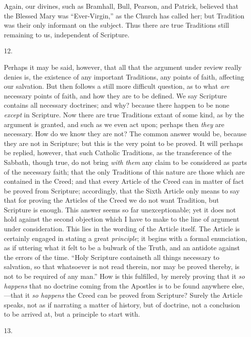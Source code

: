 Again, our divines, such as Bramhall, Bull, Pearson, and Patrick,
believed that the Blessed Mary was ``Ever-Virgin,'' as the
Church has called her; but Tradition was their only informant on the
subject. Thus there are true Traditions still remaining to us,
independent of Scripture.

12.

Perhaps it may be said, however, that all that the argument under
review really denies is, the existence of any important Traditions,
any points of faith, affecting our salvation. But then follows a still
more difficult question, as to what \emph{are} necessary points of
faith, and how they are to be defined. We say Scripture contains all
necessary doctrines; and why? because there happen to be none \emph{except}
in Scripture. Now there are true Traditions extant of some kind, as by
the argument is granted, and such as we even act upon; perhaps then \emph{they} are necessary. How do we know they are not? The common answer
would be, because they are not in Scripture; but this is the very
point to be proved. It will perhaps be replied, however, that such
Catholic Traditions, as the transference of the Sabbath, though
true, do not bring \emph{with them} any claim to be considered as
parts of the necessary faith; that the only Traditions of this nature
are those which are contained in the Creed; and that every Article of
the Creed can in matter of fact be proved from Scripture; accordingly,
that the Sixth Article only means to say that for proving the Articles
of the Creed we do not want Tradition, but Scripture is enough. This
answer seems so far unexceptionable; yet it does not hold against the
second objection which I have to make to the line of argument under
consideration. This lies in the wording of the Article itself. The
Article is certainly engaged in stating a great \emph{principle}; it
begins with a formal enunciation, as if uttering what it felt to be a
bulwark of the Truth, and an antidote against the errors of the time.
``Holy Scripture containeth all things necessary to salvation, so
that whatsoever is not read therein, nor may be proved thereby, is not
to be required of any man.'' How is this fulfilled, by merely
proving that it \emph{so happens} that no doctrine coming from the
Apostles is to be found anywhere else,—that it \emph{so happens} the
Creed can be proved from Scripture? Surely the Article speaks, not as
if narrating a matter of history, but of doctrine, not a conclusion to
be arrived at, but a principle to start with.

13.


